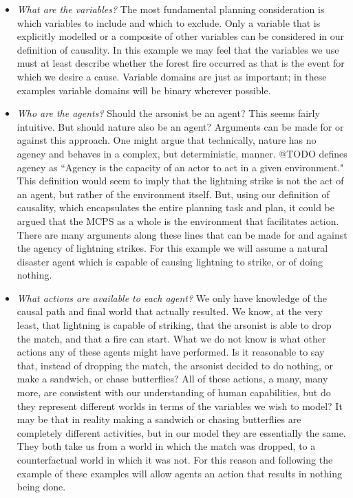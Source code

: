 \documentclass{article}
\theoremstyle{plain}
\theoremstyle{definition}
\begin{document}
\begin{itemize}

\item \textit{What are the variables?} The most fundamental planning consideration is which variables to include and which to exclude. Only a variable that is explicitly modelled or a composite of other variables can be considered in our definition of causality. In this example we may feel that the variables we use must at least describe whether the forest fire occurred as that is the event for which we desire a cause. Variable domains are just as important; in these examples variable domains will be binary wherever possible.

\item \textit{Who are the agents?} Should the arsonist be an agent? This seems fairly intuitive. But should nature also be an agent? Arguments can be made for or against this approach. One might argue that technically, nature has no agency and behaves in a complex, but deterministic, manner. @TODO defines agency as ``Agency is the capacity of an actor to act in a given environment." This definition would seem to imply that the lightning strike is not the act of an agent, but rather of the environment itself. But, using our definition of causality, which encapsulates the entire planning task and plan, it could be argued that the MCPS as a whole is the environment that facilitates action. There are many arguments along these lines that can be made for and against the agency of lightning strikes. For this example we will assume a natural disaster agent which is capable of causing lightning to strike, or of doing nothing.

\item \textit{What actions are available to each agent?} We only have knowledge of the causal path and final world that actually resulted. We know, at the very least, that lightning is capable of striking, that the arsonist is able to drop the match, and that a fire can start. What we do not know is what other actions any of these agents might have performed. Is it reasonable to say that, instead of dropping the match, the arsonist decided to do nothing, or make a sandwich, or chase butterflies? All of these actions, a many, many more, are consistent with our understanding of human capabilities, but do they represent different worlds in terms of the variables we wish to model? It may be that in reality making a sandwich or chasing butterflies are completely different activities, but in our model they are essentially the same. They both take us from a world in which the match was dropped, to a counterfactual world in which it was not. For this reason and following the example of \cite{lind2019ethical} these examples will allow agents an action that results in nothing being done.


\end{itemize}
\end{document}
